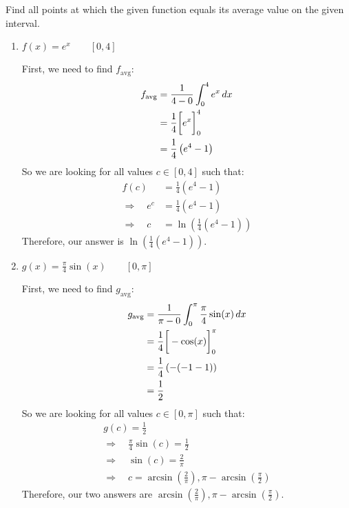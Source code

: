 \documentclass[nooutcomes]{ximera}
\begin{document}
	
	
	
			
			

\begin{problem}

Find all points at which the given function equals its average value on the given interval.
	\begin{enumerate}
	
	\item  $f(x) = e^x	\qquad	[0,4]$
		\begin{freeResponse}
		First, we need to find $f_{\text{avg}}$:
			\begin{align*}
			f_{\text{avg}} &= \frac{1}{4-0} \int_0^4 e^x \,d x  \\
			&= \frac{1}{4} \bigg[ e^x \bigg]_0^4  \\
			&= \frac{1}{4} \left( e^4 - 1 \right)  
			\end{align*}
		So we are looking for all values $c \in [0,4]$ such that:
			\begin{align*}
			f(c) &= \frac{1}{4} (e^4 - 1)  \\
			\Longrightarrow \quad e^c &= \frac{1}{4} (e^4 - 1)  \\
			\Longrightarrow \quad c &= \ln \left( \frac{1}{4} (e^4 - 1) \right)
			\end{align*}
		Therefore, our answer is $\ln \left( \frac{1}{4} (e^4 - 1) \right)$.
		\end{freeResponse}
		
		
		
	\item  $g(x) = \frac{\pi}{4} \sin(x)	\qquad	[0,\pi]$
		\begin{freeResponse}
		First, we need to find $g_{\text{avg}}$:
			\begin{align*}
			g_{\text{avg}} &= \frac{1}{\pi-0} \int_0^{\pi} \frac{\pi}{4} \sin(x) \,d x  \\
			&= \frac{1}{4} \bigg[ -\cos(x) \bigg]_0^{\pi}  \\
			&= \frac{1}{4} \left( - (-1-1) \right)  \\
			&= \frac{1}{2}
			\end{align*}
		So we are looking for all values $c \in [0,\pi]$ such that:
			\begin{align*}
			&g(c) = \frac{1}{2}  \\
			&\Longrightarrow \quad \frac{\pi}{4} \sin(c) = \frac{1}{2}  \\
			&\Longrightarrow \quad \sin(c) = \frac{2}{\pi}  \\
			&\Longrightarrow \quad c = \arcsin \left( \frac{2}{\pi} \right), \pi - \arcsin \left( \frac{\pi}{2} \right)
			&\end{align*}
		Therefore, our two answers are $\arcsin \left( \frac{2}{\pi} \right), \pi - \arcsin \left( \frac{\pi}{2} \right)$.
		\end{freeResponse}
		
		
		
	\end{enumerate}
			
			
		
\end{problem}
\end{document}
